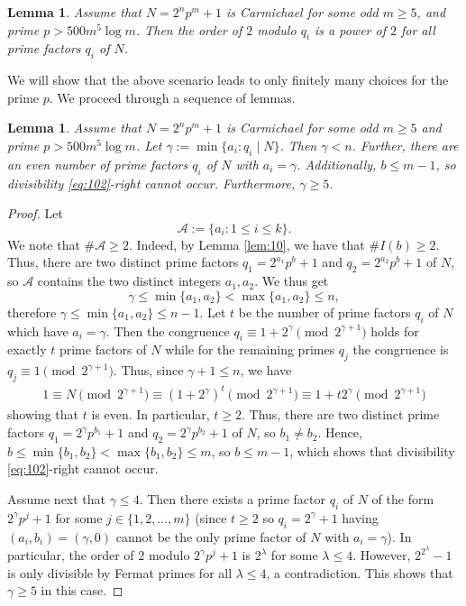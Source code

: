 \documentclass[11pt]{article}
\newtheorem{lemma}[lem]{Lemma}
\begin{document}
\begin{lemma}
Assume that $N=2^np^m+1$ is Carmichael for some odd $m\ge 5$, and prime $p>500m^5\log m$. Then the order of $2$ modulo $q_i$ is a power of $2$ for all prime factors $q_i$ of $N$.   
\end{lemma} 


We will show that the above scenario leads to only finitely many choices for the prime $p$. We proceed through a sequence of lemmas. 


\begin{lemma}
\label{lem:2}
Assume that $N=2^np^m+1$ is Carmichael for some odd $m\ge 5$ and prime $p>500m^5\log m$. Let $\gamma:=\min\{a_i: q_i\mid N\}$. 
Then $\gamma<n$. Further, there are an even number of prime factors $q_i$ of $N$ with $a_i=\gamma$. Additionally, $b\le m-1$, so divisibility \eqref{eq:102}-right cannot occur. Furthermore,  $\gamma\ge 5$. 
\end{lemma}

\begin{proof}
Let 
$$
{\mathcal A}:=\{a_i: 1\le i\le k\}.
$$
We note that $\#{\mathcal A}\ge 2$. Indeed, by Lemma \ref{lem:10}, we have that $\#{I}(b)\ge 2$. Thus, there are two distinct prime factors $q_1=2^{a_1}p^b+1$ and $q_2=2^{a_2}p^b+1$ of $N$, so ${\mathcal A}$ contains the two distinct integers $a_1,a_2$. We thus get 
$$
\gamma\le \min\{a_1,a_2\}<\max\{a_1,a_2\}\le n,
$$
therefore $\gamma\le \min\{a_1,a_2\}\le n-1$. Let $t$ be the number of prime factors  $q_i$ of $N$ which have $a_i=\gamma$. Then the congruence $q_i\equiv 1+2^{\gamma}\pmod {2^{\gamma+1}}$ holds for exactly $t$ prime factors of $N$ while for the  
remaining primes $q_j$ the congruence is $q_j\equiv 1\pmod {2^{\gamma+1}}$. Thus, since $\gamma+1\le n$, we have
\begin{eqnarray*}
1 \equiv   N\pmod {2^{\gamma+1}}\equiv (1+2^{\gamma})^t\pmod {2^{\gamma+1}}
 \equiv  1+t2^{\gamma}\pmod {2^{\gamma+1}} 
\end{eqnarray*}
showing that $t$ is even. In particular, $t\ge 2$. Thus, there are two distinct prime factors $q_1=2^\gamma p^{b_1}+1$ and $q_2=2^{\gamma}p^{b_2}+1$ of $N$, so $b_1\ne b_2$. Hence, $b\le \min\{b_1,b_2\}<\max\{b_1,b_2\}\le m$, 
so $b\le m-1$, which shows that divisibility \eqref{eq:102}-right cannot occur.

Assume next that $\gamma\le 4$. Then there exists a prime factor $q_i$ of $N$ of the form $2^{\gamma} p^j+1$ for some $j\in \{1,2,\ldots,m\}$ (since $t\ge 2$ so $q_i=2^{\gamma}+1$ having $(a_i,b_i)=(\gamma,0)$ cannot be the only prime factor 
of $N$ with $a_i=\gamma$). In particular,  the order of $2$ modulo $2^{\gamma}p^j+1$ is $2^{\lambda}$ for some $\lambda\le 4$. However, $2^{2^{\lambda}}-1$ is only divisible by Fermat primes 
for all $\lambda\le 4$, a contradiction. This shows that $\gamma\ge 5$ in this case.
\end{proof}
\end{document}
